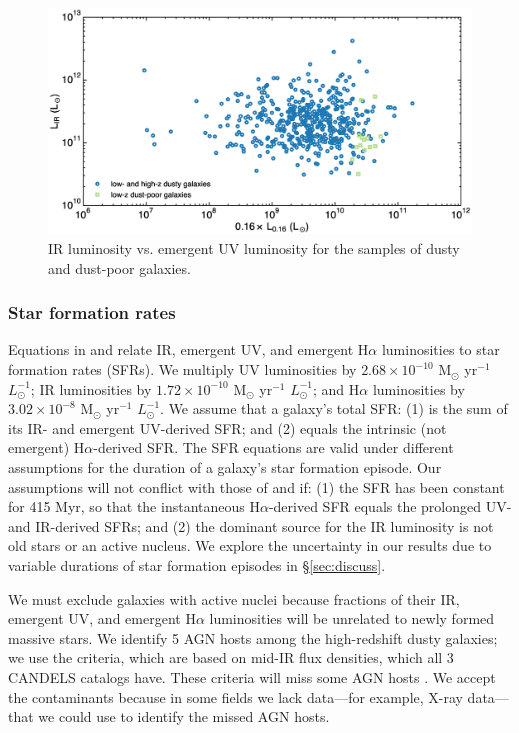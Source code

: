 \documentclass[referee]{aa}
\begin{document}
\begin{figure}[!ht]
\centering
\includegraphics[scale=0.27]{lir_luv_sample.eps}
\caption{IR luminosity vs. emergent UV luminosity for the samples of dusty
and dust-poor galaxies.\label{lir_luv}}
\end{figure}

\subsubsection{Star formation rates}\label{sfrs}

Equations in \citet{kennicutt98} and \citet{madau14} relate IR, emergent UV,
and emergent H$\alpha$ luminosities to star formation rates (SFRs).  We multiply
UV luminosities by $2.68\times10^{-10}$ M$_{\odot}$ yr$^{-1}$ $L_{\odot}^{-1}$;
IR luminosities by $1.72\times10^{-10}$ M$_{\odot}$ yr$^{-1}$ $L_{\odot}^{-1}$;
and H$\alpha$ luminosities by
$3.02\times10^{-8}$ M$_{\odot}$ yr$^{-1}$ $L_{\odot}^{-1}$.
We assume that a galaxy's total SFR: (1) is the sum of its IR- and emergent
UV-derived SFR; and (2) equals the intrinsic (not emergent)
H$\alpha$-derived SFR.  The SFR equations are valid under different assumptions
for the duration of a galaxy's star formation episode.  Our assumptions will not
conflict with those of \citet{kennicutt98} and \citet{madau14} if: (1) the SFR
has been constant for 415 Myr, so that the instantaneous
H$\alpha$-derived SFR equals the prolonged UV- and IR-derived SFRs; and (2)
the dominant source for the IR luminosity is not old stars or an active nucleus.
We explore the uncertainty in our results due to variable durations of star
formation episodes in \S\ref{sec:discuss}.

We must exclude galaxies with active nuclei because fractions of their IR,
emergent UV, and emergent H$\alpha$ luminosities will be unrelated to newly
formed massive stars.  We identify 5 AGN hosts among the high-redshift dusty
galaxies; we use the \citet{donley12} criteria, which are based on mid-IR flux
densities, which all 3 CANDELS catalogs have.  These criteria will miss some
AGN hosts \citep{juneau13}.  We accept the contaminants because in some fields
we lack data---for example, X-ray data---that we could use to identify the
missed AGN hosts.
\end{document}
